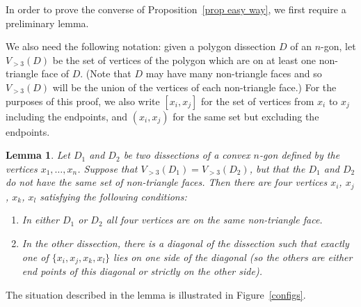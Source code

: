 \documentclass[11pt]{article}
\newtheorem{lem}[thm]{Lemma}
\theoremstyle{remark}
\theoremstyle{definition}
\begin{document}
In order to prove the converse of Proposition~\ref{prop easy way}, we first require a preliminary lemma.

We also need the following notation: given a polygon dissection $D$ of an $n$-gon, let $V_{>3}(D)$ be the set of vertices of the polygon which are on at least one non-triangle face of $D$.  (Note that $D$ may have many non-triangle faces and so $V_{>3}(D)$ will be the union of the vertices of each non-triangle face.) For the purposes of this proof, we also write $[x_i,x_j]$ for the set of vertices from $x_i$ to $x_j$ including the endpoints, and $(x_i,x_j)$ for the same set but excluding the endpoints. 

\begin{lem}\label{lem good quads}
Let $D_1$ and $D_2$ be two dissections of a convex $n$-gon defined by the vertices $x_1, \ldots, x_n$.  Suppose that $V_{>3}(D_1) = V_{>3}(D_2)$, but that the $D_1$ and $D_2$ do not have the same set of non-triangle faces.  Then there are four vertices $x_i$, $x_j$, $x_k$, $x_l$ satisfying the following conditions:\begin{enumerate} \item In either $D_1$ or $D_2$ all four vertices are on the same non-triangle face. \item In the other dissection, there is a diagonal of the dissection such that exactly one of $\{x_i, x_j, x_k, x_l\}$ lies on one side of the diagonal (so the others are either end points of this diagonal or strictly on the other side). \end{enumerate}
\end{lem} 

The situation described in the lemma is illustrated in Figure~\ref{configs}.
\end{document}
